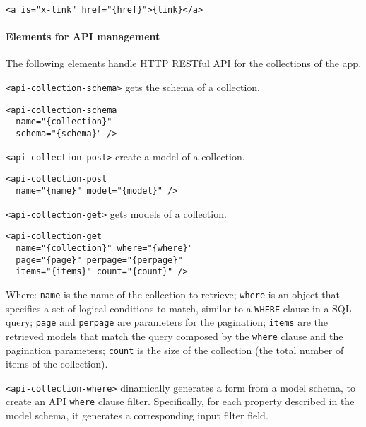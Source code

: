 \begin{lstlisting}[language=HTML5]
<a is="x-link" href="{href}">{link}</a>
\end{lstlisting}

\paragraph{Elements for API management}

The following elements handle HTTP RESTful API for the collections of the app.

\texttt{<api-collection-schema>} gets the schema of a collection. 

\begin{lstlisting}[language=HTML5]
<api-collection-schema 
  name="{collection}" 
  schema="{schema}" />
\end{lstlisting}

\vspace{0.2cm}

\texttt{<api-collection-post>} create a model of a collection. 

\begin{lstlisting}[language=HTML5]
<api-collection-post 
  name="{name}" model="{model}" />
\end{lstlisting}

\vspace{0.2cm}

\texttt{<api-collection-get>} gets models of a collection. 

\begin{lstlisting}[language=HTML5]
<api-collection-get 
  name="{collection}" where="{where}" 
  page="{page}" perpage="{perpage}"  
  items="{items}" count="{count}" />
\end{lstlisting}

Where: 
\texttt{name} is the name of the collection to retrieve; 
\texttt{where} is an object that specifies a set of logical conditions to match, similar to a \texttt{WHERE} clause in a SQL query;
\texttt{page} and \texttt{perpage} are parameters for the pagination;
\texttt{items} are the retrieved models that match the query composed by the \texttt{where} clause and the pagination parameters;
\texttt{count} is the size of the collection (the total number of items of the collection).

\vspace{0.2cm}

\texttt{<api-collection-where>} dinamically generates a form from a model schema, to create an API \texttt{where} clause filter. Specifically, for each property described in the model schema, it generates a corresponding input filter field. 

